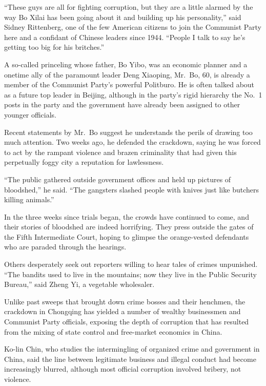 ﻿\documentclass[12pt]{article}
\begin{document}
``These guys are all for fighting corruption, but they are a little alarmed by the way Bo Xilai has
been going about it and building up his personality,'' said Sidney Rittenberg, one of the few
American citizens to join the Communist Party here and a confidant of Chinese leaders since 1944.
``People I talk to say he's getting too big for his britches.''

A so-called princeling whose father, Bo Yibo, was an economic planner and a onetime ally of the
paramount leader Deng Xiaoping, Mr.~Bo, 60, is already a member of the Communist Party's powerful
Politburo. He is often talked about as a future top leader in Beijing, although in the party's rigid
hierarchy the No.~1 posts in the party and the government have already been assigned to other
younger officials.

Recent statements by Mr.~Bo suggest he understands the perils\cite{peril} of drawing too much
attention. Two weeks ago, he defended the crackdown, saying he was forced to act by the rampant
violence and brazen criminality that had given this perpetually foggy city a reputation for
lawlessness.

``The public gathered outside government offices and held up pictures of bloodshed,'' he said. ``The
gangsters slashed people with knives just like butchers killing animals.''

In the three weeks since trials began, the crowds have continued to come, and their stories of
bloodshed are indeed horrifying. They press outside the gates of the Fifth Intermediate Court,
hoping to glimpse the orange-vested defendants who are paraded through the hearings.

Others desperately seek out reporters willing to hear tales of crimes unpunished. ``The
bandits\cite{bandit} used to live in the mountains; now they live in the Public Security Bureau,''
said Zheng Yi, a vegetable wholesaler.

Unlike past sweeps that brought down crime bosses and their henchmen, the crackdown in Chongqing has
yielded a number of wealthy businessmen and Communist Party officials, exposing the depth of
corruption that has resulted from the mixing of state control and free-market economics in China.

Ko-lin Chin, who studies the intermingling of organized crime and government in China, said the line
between legitimate business and illegal conduct had become increasingly blurred, although most
official corruption involved bribery, not violence.
\end{document}
